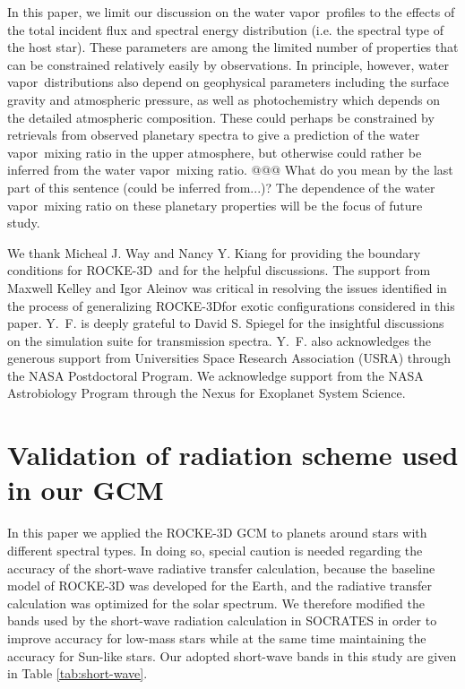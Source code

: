 \documentclass[11pt,numberedappendix,twocolappendix,]{emulateapj}
\def\modelE{ROCKE-3D}
\newcommand{\dsa}[1]{{\color{blue}#1}}
\newcommand{\wv}{{\color{orange}water vapor\ }}
\begin{document}
In this paper, we limit our discussion on the \wv profiles to the effects of the total incident flux and spectral energy distribution (i.e. the spectral type of the host star). 
These parameters are among the limited number of properties that can be constrained relatively easily by observations. 
In principle, however, \wv distributions also depend on geophysical parameters including the surface gravity and atmospheric pressure, as well as photochemistry which depends on the detailed atmospheric composition. 
These could perhaps be constrained by retrievals from observed planetary spectra to give a prediction of the \wv mixing ratio in the upper atmosphere, but otherwise could rather be inferred from the \wv mixing ratio. \dsa{@@@ What do you mean by the last part of this sentence (could be inferred from...)?}
The dependence of the \wv mixing ratio on these planetary properties will be  the focus of future study. 





\acknowledgments
We thank Micheal J. Way and Nancy Y. Kiang for providing the boundary conditions for \modelE \ and for the helpful discussions. 
The support from Maxwell Kelley and Igor Aleinov was critical in resolving the issues identified in the process of generalizing \modelE for exotic configurations considered in this paper. 
Y.~F. is deeply grateful to David S. Spiegel for the insightful discussions on the simulation suite for transmission spectra. 
Y.~F. also acknowledges the generous support from Universities Space Research Association (USRA) through the NASA Postdoctoral Program. 
We acknowledge support from the NASA Astrobiology Program through the Nexus for Exoplanet System Science.




\appendix


\section{Validation of radiation scheme used in our GCM}
\label{ap:radiation}

In this paper we applied the ROCKE-3D GCM to planets around stars with different spectral types. 
In doing so, special caution is needed regarding the accuracy of the short-wave radiative transfer calculation, because the baseline model of ROCKE-3D was  developed for the Earth, and the radiative transfer calculation was optimized for the solar spectrum. 
We therefore modified the bands used by the short-wave radiation calculation in SOCRATES in order to improve accuracy for low-mass stars while at the same time maintaining the accuracy for Sun-like stars.
Our adopted short-wave bands in this study are given in Table \ref{tab:short-wave}.
\end{document}
